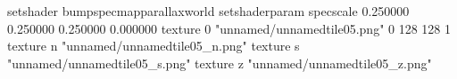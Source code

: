 setshader bumpspecmapparallaxworld
setshaderparam specscale 0.250000 0.250000 0.250000 0.000000
texture 0 "unnamed/unnamedtile05.png" 0 128 128 1
texture n "unnamed/unnamedtile05_n.png"
texture s "unnamed/unnamedtile05_s.png"
texture z "unnamed/unnamedtile05_z.png"